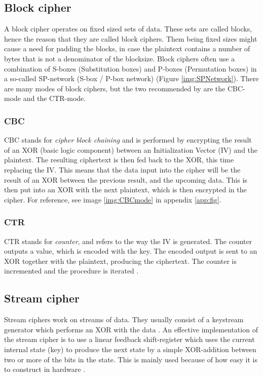 \subsection{Block cipher}\label{sec:BlockCipher}
A block cipher operates on fixed sized sets of data. These sets are 
called blocks, hence the reason that they are called block ciphers. 
Them being fixed sizes might cause a need for padding the blocks, in 
case the plaintext contains a number of bytes that is not a denominator
of the blocksize. Block ciphers often use a combination of S-boxes 
(Substitution boxes) and P-boxes (Permutation boxes) in a so-called 
SP-network (S-box / P-box network) (Figure \ref{img:SPNetwork}).
There are many modes of block ciphers, but the two recommended by 
\citet{Schneier:2003} are the CBC-mode and the CTR-mode.

\subsubsection{CBC}
CBC stands for \emph{cipher block chaining} and is performed by 
encrypting the result of an XOR (basic logic component) between 
an Initialization Vector (IV) and the plaintext. The resulting 
ciphertext is then fed back to the XOR, this time replacing the IV.
This means that the data input into the cipher will be the result of 
an XOR between the previous result, and the upcoming data. This is 
then put into an XOR with the next plaintext, which is then encrypted 
in the cipher. For reference, see image \ref{img:CBCmode} in 
appendix \ref{app:fig}. \citep[pp. 109--111]{Stinson:2006}

\subsubsection{CTR}
CTR stands for \emph{counter}, and refers to the way the IV is 
generated. The counter outputs a value, which is encoded with the key. 
The encoded output is sent to an XOR together with the plaintext, 
producing the ciphertext. The counter is incremented and the procedure 
is iterated \citep[p. 111]{Stinson:2006}.

\subsection{Stream cipher} \label{sec:StreamCipher}
Stream ciphers work on streams of data. They usually consist of a 
keystream generator which performs an XOR with the data 
\cite[pp. 67]{Simmons:1992}. An effective implementation of the stream 
cipher is to use a linear feedback shift-register which uses the 
current internal state (key) to produce the next state by a simple 
XOR-addition between two or more of the bits in the state. This is 
mainly used because of how easy it is to construct in hardware 
\citep{LFSR:2008}.


